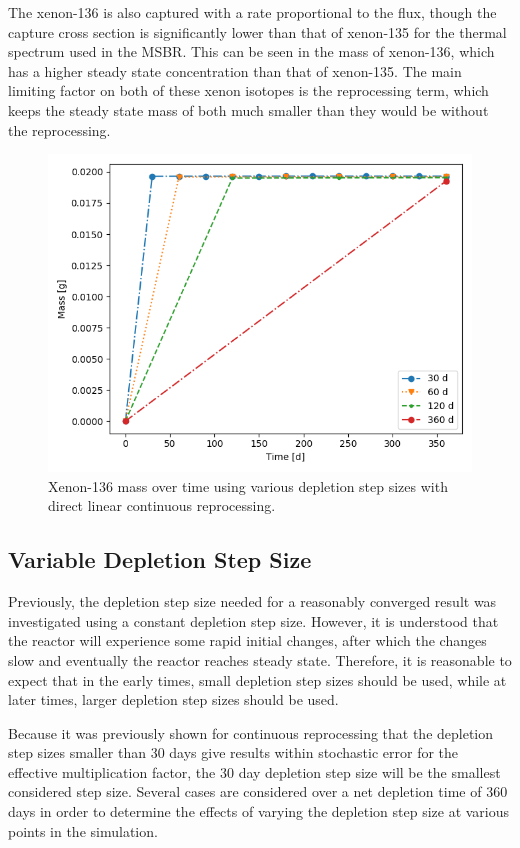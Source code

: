 The xenon-136 is also captured with a rate proportional to the flux, though the capture cross section is significantly lower than that of xenon-135 for the thermal spectrum used in the MSBR. This can be seen in the mass of xenon-136, which has a higher steady state concentration than that of xenon-135. The main limiting factor on both of these xenon isotopes is the reprocessing term, which keeps the steady state mass of both much smaller than they would be without the reprocessing.

\begin{figure}[H]
  \centering
  \includegraphics[scale=0.7]{images/DL_NSTEP_Xe-136_mass-large.png}
  \caption{Xenon-136 mass over time using various depletion step sizes with direct linear continuous reprocessing.}
   \label{fig:DL-cont-xe136-2}
\end{figure}


\subsection{Variable Depletion Step Size}

Previously, the depletion step size needed for a reasonably converged result was investigated using a constant depletion step size. However, it is understood that the reactor will experience some rapid initial changes, after which the changes slow and eventually the reactor reaches steady state. Therefore, it is reasonable to expect that in the early times, small depletion step sizes should be used, while at later times, larger depletion step sizes should be used.

Because it was previously shown for continuous reprocessing that the depletion step sizes smaller than 30 days give results within stochastic error for the effective multiplication factor, the 30 day depletion step size will be the smallest considered step size. Several cases are considered over a net depletion time of 360 days in order to determine the effects of varying the depletion step size at various points in the simulation.


